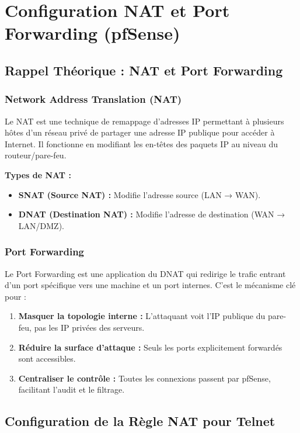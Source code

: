 \documentclass[12pt,a4paper,openany]{report}
\begin{document}
	\chapter{Configuration NAT et Port Forwarding (pfSense)}
	
	\section{Rappel Théorique : NAT et Port Forwarding}
	
	\subsection{Network Address Translation (NAT)}
	Le NAT est une technique de remappage d'adresses IP permettant à plusieurs hôtes d'un réseau privé de partager une adresse IP publique pour accéder à Internet. Il fonctionne en modifiant les en-têtes des paquets IP au niveau du routeur/pare-feu.
	
	\textbf{Types de NAT :}
	\begin{itemize}
		\item \textbf{SNAT (Source NAT) :} Modifie l'adresse source (LAN → WAN).
		\item \textbf{DNAT (Destination NAT) :} Modifie l'adresse de destination (WAN → LAN/DMZ).
	\end{itemize}
	
	\subsection{Port Forwarding}
	Le Port Forwarding est une application du DNAT qui redirige le trafic entrant d'un port spécifique vers une machine et un port internes. C'est le mécanisme clé pour :
	
	\begin{enumerate}
		\item \textbf{Masquer la topologie interne :} L'attaquant voit l'IP publique du pare-feu, pas les IP privées des serveurs.
		\item \textbf{Réduire la surface d'attaque :} Seuls les ports explicitement forwardés sont accessibles.
		\item \textbf{Centraliser le contrôle :} Toutes les connexions passent par pfSense, facilitant l'audit et le filtrage.
	\end{enumerate}
	
	\section{Configuration de la Règle NAT pour Telnet}
	
\end{document}
